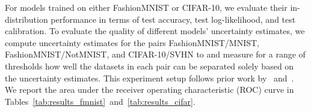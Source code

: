 For models trained on either FashionMNIST or CIFAR-10, we evaluate their in-distribution performance in terms of test accuracy, test log-likelihood, and test calibration.
To evaluate the quality of different models' uncertainty estimates, we compute uncertainty estimates for the pairs FashionMNIST/MNIST, FashionMNIST/NotMNIST, and CIFAR-10/SVHN to and measure for a range of thresholds how well the datasets in each pair can be separated solely based on the uncertainty estimates.
This experiment setup follows prior work by~\citet{van2020uncertainty} and~\citet{immer2020improving}.
We report the area under the receiver operating characteristic (ROC) curve in Tables~\ref{tab:results_fmnist}~and~\ref{tab:results_cifar}.
%




%

%
%
%
%
%
%
%
%
%
%
%
%
%
%
%
%
%
%
%
%
%
%
%
%
%
%
%
%
%
%
%
%



%

